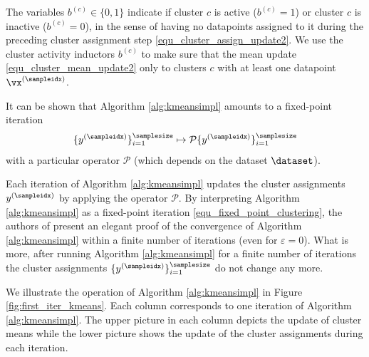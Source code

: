 \documentclass[12pt]{report}
\begin{document}
The variables $b^{(c)} \in \{0,1\}$ indicate if cluster $c$ is 
active ($b^{(c)}= 1$) or cluster $c$ is inactive ($b^{(c)}=0$), 
in the sense of having no datapoints assigned to it during 
the preceding cluster assignment step \eqref{equ_cluster_assign_update2}. 
We use the cluster activity inductors $b^{(c)}$ to make sure 
that the mean update \eqref{equ_cluster_mean_update2} only 
to clusters $c$ with at least one datapoint $\vx^{(\sampleidx)}$. 

It can be shown that Algorithm \ref{alg:kmeansimpl} amounts to 
a fixed-point iteration 
\begin{equation}
\label{equ_fixed_point_clustering}
\{ y^{(\sampleidx)} \}_{i=1}^{\samplesize} \mapsto \mathcal{P}  \{ y^{(\sampleidx)} \}_{i=1}^{\samplesize}
\end{equation}
with a particular operator $\mathcal{P}$ (which depends on 
the dataset $\dataset$). 

Each iteration of Algorithm \ref{alg:kmeansimpl} updates the cluster 
assignments $y^{(\sampleidx)}$ by applying the operator $\mathcal{P}$. 
By interpreting Algorithm \ref{alg:kmeansimpl} as a fixed-point iteration 
\eqref{equ_fixed_point_clustering}, the authors of \cite[Thm. 2]{Gray1980} 
present an elegant proof of the convergence of Algorithm \ref{alg:kmeansimpl} 
within a finite number of iterations (even for $\varepsilon = 0$). What is more, 
after running Algorithm \ref{alg:kmeansimpl} for a finite number of iterations 
the cluster assignments $\{ y^{(\sampleidx)} \}_{i=1}^{\samplesize}$ do 
not change any more.   

We illustrate the operation of Algorithm \ref{alg:kmeansimpl} in 
Figure \ref{fig:first_iter_kmeans}. Each column corresponds to 
one iteration of Algorithm \ref{alg:kmeansimpl}. The upper picture 
in each column depicts the update of cluster means while the 
lower picture shows the update of the cluster assignments 
during each iteration. 
\end{document}
